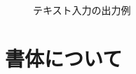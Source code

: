 {\begin{Prob}
\begin{figure}[htbp]
 \noindent\IOmargin{}
\caption{テキスト入力の出力例}\label{fig:sample}
\end{figure}

\end{Prob}



\section{書体について}

}
